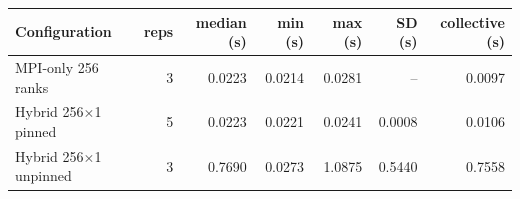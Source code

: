 \begin{tabular}{lrrrrrr}
\toprule
Configuration & reps & median (s) & min (s) & max (s) & SD (s) & collective (s)\\
\midrule
MPI-only 256 ranks & 3 & 0.0223 & 0.0214 & 0.0281 & -- & 0.0097\\
Hybrid 256$\times$1 pinned & 5 & 0.0223 & 0.0221 & 0.0241 & 0.0008 & 0.0106\\
Hybrid 256$\times$1 unpinned & 3 & 0.7690 & 0.0273 & 1.0875 & 0.5440 & 0.7558\\
\bottomrule
\end{tabular}
